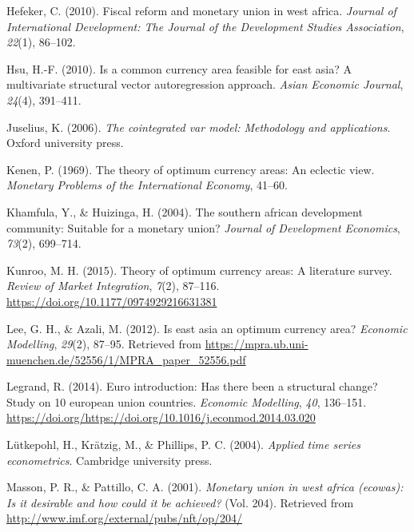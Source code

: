 \documentclass[]{article}
\begin{document}
\leavevmode\hypertarget{ref-hefeker2010fiscal}{}%
Hefeker, C. (2010). Fiscal reform and monetary union in west africa. \emph{Journal of International Development: The Journal of the Development Studies Association}, \emph{22}(1), 86--102.

\leavevmode\hypertarget{ref-hsu2010common}{}%
Hsu, H.-F. (2010). Is a common currency area feasible for east asia? A multivariate structural vector autoregression approach. \emph{Asian Economic Journal}, \emph{24}(4), 391--411.

\leavevmode\hypertarget{ref-juselius2006cointegrated}{}%
Juselius, K. (2006). \emph{The cointegrated var model: Methodology and applications}. Oxford university press.

\leavevmode\hypertarget{ref-kenen1969theory}{}%
Kenen, P. (1969). The theory of optimum currency areas: An eclectic view. \emph{Monetary Problems of the International Economy}, 41--60.

\leavevmode\hypertarget{ref-khamfula2004southern}{}%
Khamfula, Y., \& Huizinga, H. (2004). The southern african development community: Suitable for a monetary union? \emph{Journal of Development Economics}, \emph{73}(2), 699--714.

\leavevmode\hypertarget{ref-Kunroo2015}{}%
Kunroo, M. H. (2015). Theory of optimum currency areas: A literature survey. \emph{Review of Market Integration}, \emph{7}(2), 87--116. \url{https://doi.org/10.1177/0974929216631381}

\leavevmode\hypertarget{ref-lee2012east}{}%
Lee, G. H., \& Azali, M. (2012). Is east asia an optimum currency area? \emph{Economic Modelling}, \emph{29}(2), 87--95. Retrieved from \url{https://mpra.ub.uni-muenchen.de/52556/1/MPRA_paper_52556.pdf}

\leavevmode\hypertarget{ref-LEGRAND2014136}{}%
Legrand, R. (2014). Euro introduction: Has there been a structural change? Study on 10 european union countries. \emph{Economic Modelling}, \emph{40}, 136--151. \url{https://doi.org/https://doi.org/10.1016/j.econmod.2014.03.020}

\leavevmode\hypertarget{ref-lutkepohl2004applied}{}%
Lütkepohl, H., Krätzig, M., \& Phillips, P. C. (2004). \emph{Applied time series econometrics}. Cambridge university press.

\leavevmode\hypertarget{ref-masson2001monetary}{}%
Masson, P. R., \& Pattillo, C. A. (2001). \emph{Monetary union in west africa (ecowas): Is it desirable and how could it be achieved?} (Vol. 204). Retrieved from \url{http://www.imf.org/external/pubs/nft/op/204/}
\end{document}
